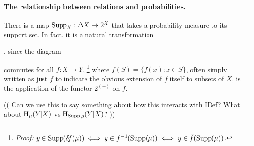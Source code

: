 



\paragraph{The relationship between relations and probabilities.}
There is a map $\operatorname{\mathrm{Supp}}_X : \Delta X \to 2^X$ that takes a probability measure to its support set.  In fact, it is a natural transformation
\begin{center}
,
    \qquad
    since the diagram
    \qquad
{}
\end{center}
commutes for all $f : X \to Y$,%
\unskip\footnote{\textit{Proof:} 
$
    y \in \operatorname{\mathrm{Supp}}(\delta\!f(\mu)) 
    \iff y \in f^{-1}( \operatorname{\mathrm{Supp}}(\mu))
    \iff y \in \bar f(\operatorname{\mathrm{Supp}}(\mu))
$.
}
where
$\bar f(S) = \{ f(x) : x \in S\}$, often simply written as just $f$ to indicate the obvious extension of $f$ itself to subsets of $X$, is the application of the functor $2^{(-)}$ on $f$.


(( Can we use this to say something about how this interacts with IDef? What about $\operatorname{\mathrm{H}}_\mu(Y|X)$ vs $\operatorname{\mathrm{H}}_{\operatorname{\mathrm{Supp}} \mu}(Y|X)$? ))
